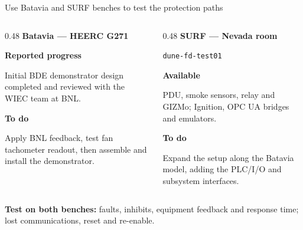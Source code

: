 \begin{frame}{Use Batavia and SURF benches to test the protection paths}
\begin{columns}[T,onlytextwidth]
\begin{column}{0.48\textwidth}
\textbf{Batavia --- HEERC G271}\par\medskip
\textbf{Reported progress}\par\smallskip
Initial BDE demonstrator design completed and reviewed with the WIEC team at BNL.\par\bigskip
\textbf{To do}\par\smallskip
Apply BNL feedback, test fan tachometer readout, then assemble and install the demonstrator.
\end{column}
\begin{column}{0.48\textwidth}
\textbf{SURF --- Nevada room}\par\smallskip
\texttt{dune-fd-test01}\par\medskip
\textbf{Available}\par\smallskip
PDU, smoke sensors, relay and GIZMo; Ignition, OPC UA bridges and emulators.\par\bigskip
\textbf{To do}\par\smallskip
Expand the setup along the Batavia model, adding the PLC/I/O and subsystem interfaces.
\end{column}
\end{columns}\par\bigskip
\textbf{Test on both benches:} faults, inhibits, equipment feedback and response time; lost communications, reset and re-enable.
\end{frame}

\DpsMilestones
